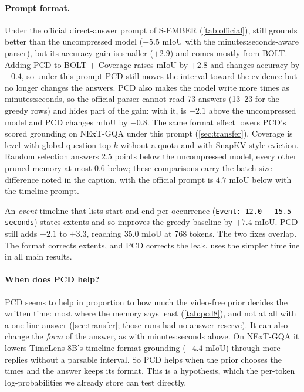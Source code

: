 \paragraph{Prompt format.}
Under the official direct-answer prompt of S-EMBER (\cref{tab:official}), \method still grounds better than the
uncompressed model ($+5.5$ mIoU with the minutes:seconds-aware parser), but its accuracy gain is smaller ($+2.9$) and
comes mostly from BOLT. Adding PCD to BOLT $+$ Coverage raises mIoU by $+2.8$ and changes accuracy by $-0.4$, so under
this prompt PCD still moves the interval toward the evidence but no longer changes the answers. PCD also makes the
model write more times as minutes:seconds, so the official parser cannot read 73 \method answers (13--23 for the
greedy rows) and hides part of the gain: with it, \method is $+2.1$ above the uncompressed model and PCD changes mIoU
by $-0.8$. The same format effect lowers PCD's scored grounding on NExT-GQA under this prompt
(\cref{sec:transfer}). Coverage is level with global question top-$k$ without a quota and with SnapKV-style eviction.
Random selection answers 2.5 points below the uncompressed model, every other pruned memory at most 0.6 below; these
comparisons carry the batch-size difference noted in the caption. \method with the official prompt is $4.7$ mIoU
below \method with the timeline prompt. 

An \emph{event} timeline that lists start and end per occurrence (\texttt{Event: 12.0 -- 15.5 seconds}) states
extents and so improves the greedy baseline by $+7.4$ mIoU. PCD still adds $+2.1$ to $+3.3$, reaching 35.0 mIoU at
768 tokens. The two fixes overlap. The format corrects extents, and PCD
corrects the leak. \method uses the simpler timeline in all main results. 

\paragraph{When does PCD help?}
PCD seems to help in proportion to how much the video-free prior decides the written time: most where the memory says
least (\cref{tab:pcd8}), and not at all with a one-line answer (\cref{sec:transfer}; those runs had no answer
reserve). It can also change the \emph{form} of the answer, as with minutes:seconds above. On NExT-GQA it lowers
TimeLens-8B's timeline-format grounding ($-4.4$ mIoU) through more replies without a parsable interval. So PCD helps
when the prior chooses the times and the answer keeps its format. This is a hypothesis, which the per-token
log-probabilities we already store can test directly. 

